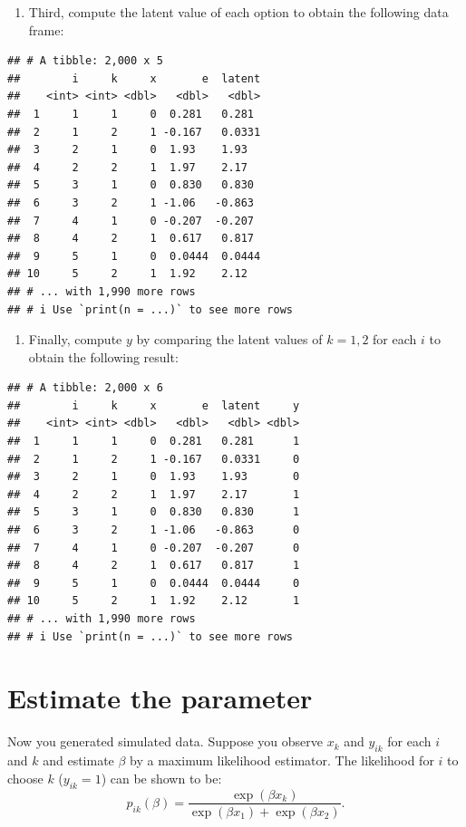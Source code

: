 \documentclass[
]{book}
\providecommand{\tightlist}{%
  \setlength{\itemsep}{0pt}\setlength{\parskip}{0pt}}
\begin{document}
\begin{enumerate}
\def\labelenumi{\arabic{enumi}.}
\setcounter{enumi}{2}
\tightlist
\item
  Third, compute the latent value of each option to obtain the following data frame:
\end{enumerate}

\begin{verbatim}
## # A tibble: 2,000 x 5
##        i     k     x       e  latent
##    <int> <int> <dbl>   <dbl>   <dbl>
##  1     1     1     0  0.281   0.281 
##  2     1     2     1 -0.167   0.0331
##  3     2     1     0  1.93    1.93  
##  4     2     2     1  1.97    2.17  
##  5     3     1     0  0.830   0.830 
##  6     3     2     1 -1.06   -0.863 
##  7     4     1     0 -0.207  -0.207 
##  8     4     2     1  0.617   0.817 
##  9     5     1     0  0.0444  0.0444
## 10     5     2     1  1.92    2.12  
## # ... with 1,990 more rows
## # i Use `print(n = ...)` to see more rows
\end{verbatim}

\begin{enumerate}
\def\labelenumi{\arabic{enumi}.}
\setcounter{enumi}{3}
\tightlist
\item
  Finally, compute \(y\) by comparing the latent values of \(k = 1, 2\) for each \(i\) to obtain the following result:
\end{enumerate}

\begin{verbatim}
## # A tibble: 2,000 x 6
##        i     k     x       e  latent     y
##    <int> <int> <dbl>   <dbl>   <dbl> <dbl>
##  1     1     1     0  0.281   0.281      1
##  2     1     2     1 -0.167   0.0331     0
##  3     2     1     0  1.93    1.93       0
##  4     2     2     1  1.97    2.17       1
##  5     3     1     0  0.830   0.830      1
##  6     3     2     1 -1.06   -0.863      0
##  7     4     1     0 -0.207  -0.207      0
##  8     4     2     1  0.617   0.817      1
##  9     5     1     0  0.0444  0.0444     0
## 10     5     2     1  1.92    2.12       1
## # ... with 1,990 more rows
## # i Use `print(n = ...)` to see more rows
\end{verbatim}

\hypertarget{estimate-the-parameter}{%
\section{Estimate the parameter}\label{estimate-the-parameter}}

Now you generated simulated data. Suppose you observe \(x_k\) and \(y_{ik}\) for each \(i\) and \(k\) and estimate \(\beta\) by a maximum likelihood estimator. The likelihood for \(i\) to choose \(k\) (\(y_{ik} = 1\)) can be shown to be:
\[
p_{ik}(\beta) = \frac{\exp(\beta x_k)}{\exp(\beta x_1) + \exp(\beta x_2)}.
\]
\end{document}
